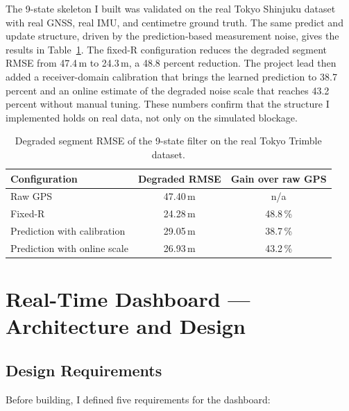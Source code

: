 \documentclass[12pt,a4paper]{article}
\begin{document}
The 9-state skeleton I built was validated on the real Tokyo Shinjuku dataset with real
GNSS, real IMU, and centimetre ground truth. The same predict and update structure, driven
by the prediction-based measurement noise, gives the results in
Table~\ref{tab:mustapha_ekf}. The fixed-R configuration reduces the degraded segment RMSE
from 47.4\,m to 24.3\,m, a 48.8 percent reduction. The project lead then added a
receiver-domain calibration that brings the learned prediction to 38.7 percent and an
online estimate of the degraded noise scale that reaches 43.2 percent without manual
tuning. These numbers confirm that the structure I implemented holds on real data, not only
on the simulated blockage.

\begin{table}[H]
  \centering
  \caption{Degraded segment RMSE of the 9-state filter on the real Tokyo Trimble dataset.}
  \label{tab:mustapha_ekf}
  \begin{tabular}{lcc}
    \toprule
    \textbf{Configuration} & \textbf{Degraded RMSE} & \textbf{Gain over raw GPS} \\
    \midrule
    Raw GPS                      & 47.40\,m & n/a \\
    Fixed-R                      & 24.28\,m & 48.8\,\% \\
    Prediction with calibration  & 29.05\,m & 38.7\,\% \\
    Prediction with online scale & 26.93\,m & 43.2\,\% \\
    \bottomrule
  \end{tabular}
\end{table}

\section{Real-Time Dashboard --- Architecture and Design}

\subsection{Design Requirements}

Before building, I defined five requirements for the dashboard:
\end{document}
